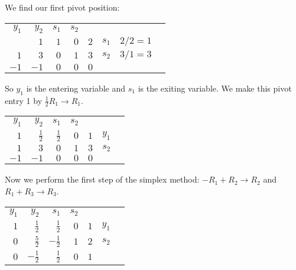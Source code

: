 \documentclass[11pt,letterpaper]{article}
\begin{document}
We find our first pivot position: 

	\begin{table}[!ht]
	\centering
	\begin{tabular}{rrrrrrr r}
	{\small $y_1$} & {\small $y_2$} & {\small $s_1$} & {\small $s_2$} \\
	\fbox{$2$} & $1$ & $1$ & \multicolumn{1}{r|}{$0$} & $2$ & {\small $s_1$} & {\small $2/2= 1$} \\
	$1$ & $3$ & $0$ & \multicolumn{1}{r|}{$1$} & $3$ & {\small $s_2$} &  {\small $3/1= 3$} \\ \cline{1-5}
	\underline{$-1$} & $-1$ & $0$ & \multicolumn{1}{r|}{$0$} & $0$ 
	\end{tabular}
	\end{table}

So $y_1$ is the entering variable and $s_1$ is the exiting variable. We make this pivot entry 1 by $\frac{1}{2}R_1 \to R_1$. \newpage

	\begin{table}[!ht]
	\centering
	\begin{tabular}{rrrrrrr}
	{\small $y_1$} & {\small $y_2$} & {\small $s_1$} & {\small $s_2$} \\
	$1$ & $\frac{1}{2}$ & $\frac{1}{2}$ & \multicolumn{1}{r|}{$0$} & $1$ & {\small $y_1$} \\
	$1$ & $3$ & $0$ & \multicolumn{1}{r|}{$1$} & $3$ & {\small $s_2$} \\ \cline{1-5}
	$-1$ & $-1$ & $0$ & \multicolumn{1}{r|}{$0$} & $0$ 
	\end{tabular}
	\end{table} \par

Now we perform the first step of the simplex method: $-R_1 + R_2 \to R_2$ and $R_1 + R_3 \to R_3$. 

	\begin{table}[!ht]
	\centering
	\begin{tabular}{rrrrrrr}
	{\small $y_1$} & {\small $y_2$} & {\small $s_1$} & {\small $s_2$} \\
	$1$ & $\frac{1}{2}$ & $\frac{1}{2}$ & \multicolumn{1}{r|}{$0$} & $1$ & {\small $y_1$} \\
	$0$ & $\frac{5}{2}$ & $-\frac{1}{2}$ & \multicolumn{1}{r|}{$1$} & $2$ & {\small $s_2$} \\ \cline{1-5}
	$0$ & $-\frac{1}{2}$ & $\frac{1}{2}$ & \multicolumn{1}{r|}{$0$} & $1$ 
	\end{tabular}
	\end{table}
\end{document}
